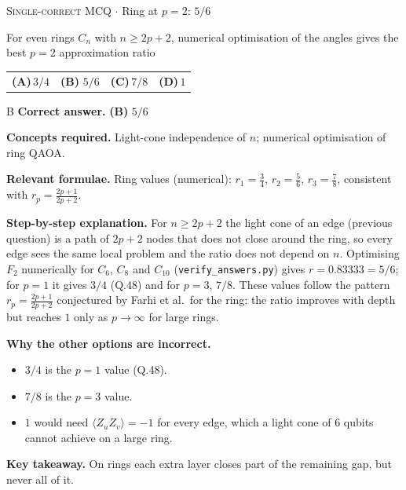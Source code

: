 \documentclass[11pt,a4paper]{article}
\newcommand{\optlabel}[1]{\textbf{(#1)}}
\newcommand{\correctlabel}[1]{\textcolor{okgreen}{\textbf{(#1)}\,\ding{51}}}
\newenvironment{qitem}[1]{\begin{list}{}{\setlength{\leftmargin}{3.3em}\setlength{\labelwidth}{3.1em}%
  \setlength{\labelsep}{0.2em}\setlength{\topsep}{3pt}\setlength{\parsep}{3pt}}\item[\textbf{Q.#1}\hfill]}{\end{list}}
\newcommand{\qsep}{\par\vspace{2pt}{\color{black!15}\hrule}\vspace{4pt}}
\newcommand{\qmeta}[2]{{\footnotesize\color{black!60}\textsc{#1} \;$\cdot$\; #2}\par}
\begin{document}
\begin{qitem}{62}
\qmeta{Single-correct MCQ}{Ring at $p = 2$: $5/6$}
For even rings $C_n$ with $n \ge 2p + 2$, numerical optimisation of the angles gives the best $p = 2$ approximation ratio
\par\smallskip\noindent\begin{tabularx}{\linewidth}{@{}*{4}{L}@{}}
\optlabel{A}\,$3/4$ & \correctlabel{B}\,$5/6$ & \optlabel{C}\,$7/8$ & \optlabel{D}\,$1$
\end{tabularx}
\end{qitem}
\begin{solbox}{B}
\textbf{\color{brand}Correct answer.} \textcolor{okgreen}{\textbf{(B)}} $5/6$

\textbf{\color{brand}Concepts required.} Light-cone independence of $n$; numerical optimisation of ring QAOA.

\textbf{\color{brand}Relevant formulae.} Ring values (numerical): $r_1 = \frac34$, $r_2 = \frac56$, $r_3 = \frac78$, consistent with $r_p = \frac{2p+1}{2p+2}$.

\textbf{\color{brand}Step-by-step explanation.} For $n \ge 2p + 2$ the light cone of an edge (previous question) is a path of $2p + 2$ nodes that does not close around the
ring, so every edge sees the same local problem and the ratio does not depend on $n$. Optimising $F_2$ numerically for
$C_6$, $C_8$ and $C_{10}$ (\texttt{verify\_answers.py}) gives $r = 0.83333 = 5/6$; for $p = 1$ it gives $3/4$ (Q.48) and for $p = 3$, $7/8$.
These values follow the pattern $r_p = \frac{2p+1}{2p+2}$ conjectured by Farhi et al.\ for the ring: the ratio improves with depth
but reaches $1$ only as $p \to \infty$ for large rings.

\textbf{\color{brand}Why the other options are incorrect.}
\begin{itemize}[leftmargin=2.4em, itemsep=1pt, topsep=2pt]
\item[\textbf{(A)}] $3/4$ is the $p = 1$ value (Q.48).
\item[\textbf{(C)}] $7/8$ is the $p = 3$ value.
\item[\textbf{(D)}] $1$ would need $\langle Z_uZ_v\rangle = -1$ for every edge, which a light cone of 6 qubits cannot achieve on a large ring.
\end{itemize}
\textbf{\color{brand}Key takeaway.} On rings each extra layer closes part of the remaining gap, but never all of it.
\end{solbox}
\qsep
\end{document}
